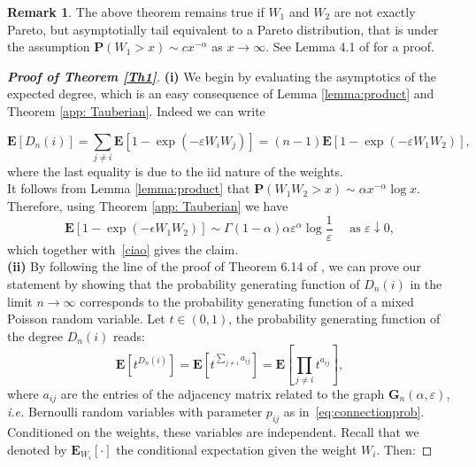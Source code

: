 \documentclass[11pt, reqno]{amsart}
\numberwithin{equation}{section}
\theoremstyle{plain} %
\theoremstyle{definition} %
\newtheorem{remark}[theorem]{Remark}
\newcommand{\eps}{\varepsilon}
\newcommand{\prob}{\mathbf{P}}
\newcommand{\E}{\mathbf{E}}
\begin{document}
\begin{remark}\label{remark:product}
The above theorem remains true if $W_1$ and $W_2$ are not exactly Pareto, but asymptotially tail equivalent to a Pareto distribution, that is under the assumption $\prob(W_1>x)\sim cx^{-\alpha}$ as $x\to \infty$. See Lemma 4.1 of \cite{AndersHedegaardJessen2006} for a proof.
\end{remark}


\begin{proof}[{\bf Proof of Theorem \ref{Th1}}]

{\bf (i)} We begin by evaluating the asymptotics of the expected degree, which is an easy consequence of Lemma \ref{lemma:product} and Theorem \ref{app: Tauberian}. Indeed we can write 

\begin{equation}\label{ciao}
    \E\left[ D_n(i)\right] = \sum_{j \neq i}\E \left[ 1-   \exp\left(-\eps W_i W_j\right) \right]= (n-1)\E \left[ 1-   \exp\left(-\eps W_1 W_2\right) \right],
\end{equation}
where the last equality is due to the iid nature of the weights.\\
It follows from Lemma \ref{lemma:product} that $\prob(W_1 W_2> x) \sim \alpha x^{-\alpha} \log{x}$.  Therefore, using Theorem \ref{app: Tauberian} we have
\begin{equation}
    \E\left[1 -  \exp\left(-\epsilon W_1 W_2\right) \right] \sim \Gamma(1-\alpha) \alpha \eps^{\alpha} \log\frac{1}{\eps} \quad\text{ as $\eps\downarrow 0$},
\end{equation}
which together with~\eqref{ciao} gives the claim.\\  


{\bf (ii)} 
By following the line of the proof of Theorem 6.14 of \cite{van2016random}, we can prove our statement by showing that the probability generating function of   $D_n(i)$   in the limit $n \to \infty$ corresponds to the probability generating function of a mixed Poisson random variable.
Let $t\in (0,1)$, the probability generating function of the degree $D_n(i)$ reads:
\begin{equation} \label{eq: Degree PGF }
    \E[t^{D_n(i)}] = \E\left[t^{\sum_{j \neq i} a_{ij}}\right] =   \E\left[\prod_{j \neq i} t^{ a_{ij}} \right],
\end{equation}
where $a_{ij}$ are the entries of the adjacency matrix related to the graph $\mathbf G_n(\alpha, \eps)$, \textit{i.e.} Bernoulli random variables with parameter $p_{ij}$ as in~\eqref{eq:connectionprob}. Conditioned on the weights, these variables are independent. Recall that we denoted by $\E_{W_i}[ \cdot]$  the conditional expectation given the weight $W_i$. Then:


\end{proof}
\end{document}
